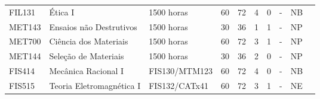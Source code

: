 \begin{table}[tbp]
{\begin{tabular}{llllllllll}
			\multicolumn{1}{|l|}{FIL131}                    & \multicolumn{1}{l|}{Ética I}                                                              & \multicolumn{1}{l|}{1500 horas}             & \multicolumn{1}{l|}{60}                                                           & \multicolumn{1}{l|}{72}               & \multicolumn{1}{l|}{4}  & \multicolumn{1}{l|}{0}  & \multicolumn{1}{l|}{-}                & \multicolumn{1}{l|}{NB}            &  \\ \cline{1-9}
			\multicolumn{1}{|l|}{MET143}                    & \multicolumn{1}{l|}{Ensaios não Destrutivos}                                              & \multicolumn{1}{l|}{1500 horas}             & \multicolumn{1}{l|}{30}                                                           & \multicolumn{1}{l|}{36}               & \multicolumn{1}{l|}{1}  & \multicolumn{1}{l|}{1}  & \multicolumn{1}{l|}{-}                & \multicolumn{1}{l|}{NP}            &  \\ \cline{1-9}
			\multicolumn{1}{|l|}{MET700}                    & \multicolumn{1}{l|}{Ciência dos Materiais}                                                & \multicolumn{1}{l|}{1500 horas}             & \multicolumn{1}{l|}{60}                                                           & \multicolumn{1}{l|}{72}               & \multicolumn{1}{l|}{3}  & \multicolumn{1}{l|}{1}  & \multicolumn{1}{l|}{-}                & \multicolumn{1}{l|}{NP}            &  \\ \cline{1-9}
			\multicolumn{1}{|l|}{MET144}                    & \multicolumn{1}{l|}{Seleção de Materiais}                                                 & \multicolumn{1}{l|}{1500 horas}             & \multicolumn{1}{l|}{30}                                                           & \multicolumn{1}{l|}{36}               & \multicolumn{1}{l|}{2}  & \multicolumn{1}{l|}{0}  & \multicolumn{1}{l|}{-}                & \multicolumn{1}{l|}{NP}            &  \\ \cline{1-9}
			\multicolumn{1}{|l|}{FIS414}                    & \multicolumn{1}{l|}{Mecânica Racional I}                                                  & \multicolumn{1}{l|}{FIS130/MTM123}          & \multicolumn{1}{l|}{60}                                                           & \multicolumn{1}{l|}{72}               & \multicolumn{1}{l|}{4}  & \multicolumn{1}{l|}{0}  & \multicolumn{1}{l|}{-}                & \multicolumn{1}{l|}{NB}            &  \\ \cline{1-9}
			\multicolumn{1}{|l|}{FIS515}                    & \multicolumn{1}{l|}{Teoria Eletromagnética I}                                             & \multicolumn{1}{l|}{FIS132/CATx41}          & \multicolumn{1}{l|}{60}                                                           & \multicolumn{1}{l|}{72}               & \multicolumn{1}{l|}{3}  & \multicolumn{1}{l|}{1}  & \multicolumn{1}{l|}{-}                & \multicolumn{1}{l|}{NE}            &  \\ \cline{1-9}

\end{tabular}}
\end{table}
